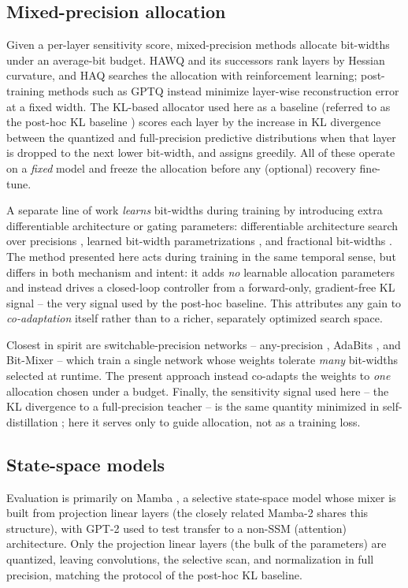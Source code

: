 \documentclass[conference]{IEEEtran}
\begin{document}
\subsection{Mixed-precision allocation}
Given a per-layer sensitivity score, mixed-precision methods allocate bit-widths
under an average-bit budget. HAWQ \cite{hawq} and its successors
\cite{hawqv2,hawqv3} rank layers by Hessian curvature, and HAQ \cite{haq} searches
the allocation with reinforcement learning; post-training methods such as GPTQ
\cite{gptq} instead minimize layer-wise reconstruction error at a fixed width. The
KL-based allocator used here as a baseline
(referred to as the post-hoc KL baseline \cite{kllens})
scores each layer by the increase in KL divergence between the quantized and
full-precision predictive distributions when that layer is dropped to the next
lower bit-width, and assigns greedily. All of these operate on a \emph{fixed} model
and freeze the allocation before any (optional) recovery fine-tune.

A separate line of work \emph{learns} bit-widths during training by introducing
extra differentiable architecture or gating parameters: differentiable
architecture search over precisions \cite{dnas,edmips}, learned bit-width
parametrizations \cite{dq}, and fractional bit-widths \cite{fracbits}. The method
presented here acts during training in the same temporal sense, but differs in both mechanism and intent: it
adds \emph{no} learnable allocation parameters and instead drives a closed-loop
controller from a forward-only, gradient-free KL signal -- the very signal used by
the post-hoc baseline. This attributes any gain to \emph{co-adaptation}
itself rather than to a richer, separately optimized search space.

Closest in spirit are switchable-precision networks -- any-precision
\cite{anyprec}, AdaBits \cite{adabits}, and Bit-Mixer \cite{bitmixer} -- which
train a single network whose weights tolerate \emph{many} bit-widths selected at
runtime. The present approach instead co-adapts the weights to \emph{one} allocation chosen under a
budget. Finally, the sensitivity signal used here -- the KL divergence to a full-precision
teacher -- is the same quantity minimized in self-distillation \cite{distill,polino};
here it serves only to guide allocation, not as a training loss.

\subsection{State-space models}
Evaluation is primarily on Mamba \cite{mamba}, a selective state-space model whose
mixer is built from projection linear layers (the closely related Mamba-2
\cite{mamba2} shares this structure), with GPT-2 \cite{gpt2} used to test transfer to
a non-SSM (attention) architecture. Only the projection linear layers
(the bulk of the parameters) are quantized, leaving convolutions, the selective scan, and
normalization in full precision, matching the protocol of the post-hoc KL baseline.
\end{document}

